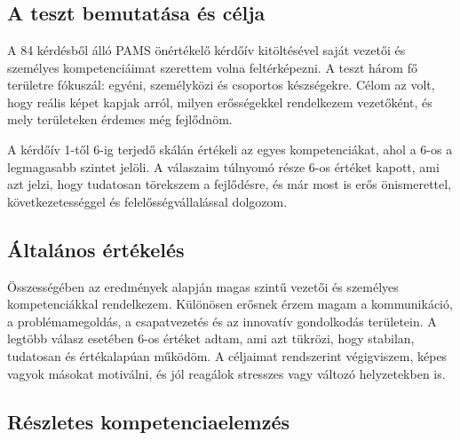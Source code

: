 \chapter{\Introspection}
\section{A teszt bemutatása és célja}

A 84 kérdésből álló PAMS önértékelő kérdőív kitöltésével saját vezetői 
és személyes kompetenciáimat szerettem volna feltérképezni.
A teszt három fő területre fókuszál: egyéni, személyközi és csoportos készségekre.
Célom az volt, hogy reális képet kapjak arról, milyen erősségekkel rendelkezem vezetőként, 
és mely területeken érdemes még fejlődnöm.

A kérdőív 1-től 6-ig terjedő skálán értékeli az egyes kompetenciákat, ahol a 6-os a legmagasabb szintet jelöli.
A válaszaim túlnyomó része 6-os értéket kapott, ami azt jelzi, hogy tudatosan törekszem a fejlődésre, 
és már most is erős önismerettel, következetességgel és felelősségvállalással dolgozom.

\section{Általános értékelés}

Összességében az eredmények alapján magas szintű vezetői és személyes kompetenciákkal rendelkezem.
Különösen erősnek érzem magam a kommunikáció, a problémamegoldás, a csapatvezetés és az innovatív gondolkodás területein.
A legtöbb válasz esetében 6-os értéket adtam, ami azt tükrözi, hogy stabilan, tudatosan és értékalapúan működöm.
A céljaimat rendszerint végigviszem, képes vagyok másokat motiválni, és jól reagálok stresszes vagy változó helyzetekben is.

\section{Részletes kompetenciaelemzés}

